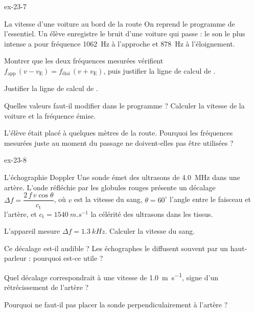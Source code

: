 \begin{blocLivre}{ex-23-7}
\begin{exercice}[2]{La vitesse d'une voiture au bord de la route}
On reprend le programme de l'essentiel. Un élève enregistre le bruit d'une voiture qui passe : le son le plus intense
a pour fréquence \qty{1062}{Hz} à l'approche et \qty{878}{Hz} à l'éloignement.
\begin{questions}
\item {}Montrer que les deux fréquences mesurées vérifient $f_\text{app}\,(v-v_\mathrm{E})=f_\text{éloi}\,(v+v_\mathrm{E})$,
puis justifier la ligne de calcul de .
\item Justifier la ligne de calcul de .
\item Quelles valeurs faut-il modifier dans le programme ? Calculer la vitesse de la voiture et la fréquence émise.
\item L'élève était placé à quelques mètres de la route. Pourquoi les fréquences mesurées juste au moment du passage ne
doivent-elles pas être utilisées ?
\end{questions}
\end{exercice}
\end{blocLivre}
\begin{blocLivre}{ex-23-8}
\begin{exercice}[2]{L'échographie Doppler}
Une sonde émet des ultrasons de \qty{4,0}{MHz} dans une artère. L'onde réfléchie par les globules rouges présente un
décalage $\Delta f=\dfrac{2\,f\,v\cos\theta}{c_\mathrm{t}}$, où $v$ est la vitesse du sang, $\theta=60^\circ$ l'angle entre le faisceau et
l'artère, et $c_\mathrm{t}=\qty{1540}{m.s^{-1}}$ la célérité des ultrasons dans les tissus.
\begin{questions}
\item L'appareil mesure $\Delta f=\qty{1,3}{kHz}$. Calculer la vitesse du sang.
\item Ce décalage est-il audible ? Les échographes le diffusent souvent par un haut-parleur : pourquoi est-ce utile ?
\item Quel décalage correspondrait à une vitesse de \qty{1,0}{m.s^{-1}}, signe d'un rétrécissement de l'artère ?
\item Pourquoi ne faut-il pas placer la sonde perpendiculairement à l'artère ?
\end{questions}
\end{exercice}
\end{blocLivre}
